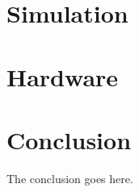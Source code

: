 \documentclass[journal,onecolumn]{IEEEtran}
\begin{document}
\section{Simulation} \label{sec:simulation}


\section{Hardware} \label{sec:hardware}







\section{Conclusion}
The conclusion goes here.






\end{document}
